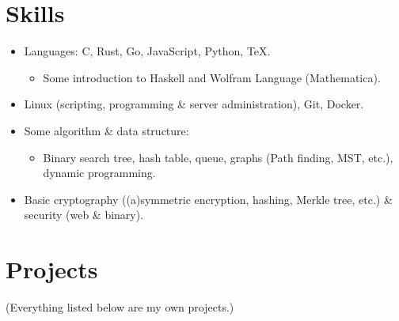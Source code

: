 \documentclass[a4paper]{article}
\begin{document}
  \section{Skills}

  \begin{itemize}[itemsep=0.1\parskip]
    \item Languages: C, Rust, Go, JavaScript, Python, \TeX.

    \begin{itemize}
      \item Some introduction to Haskell and Wolfram Language (Mathematica).
    \end{itemize}

    \item Linux (scripting, programming \& server administration), Git, Docker.

    \item Some algorithm \& data structure:

    \begin{itemize}
      \item Binary search tree, hash table, queue, graphs (Path finding, MST, etc.), dynamic programming.
    \end{itemize}

    \item Basic cryptography ((a)symmetric encryption, hashing, Merkle tree, etc.) \& security (web \& binary).

  \end{itemize}

  \section{Projects}

  \def\ghurl#1{%
    \href{#1}{({\blueghicon{}})}%
  }

  {\color{black!70!white}(Everything listed below are my own projects.)}
\end{document}
